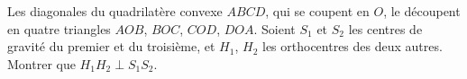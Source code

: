 Les diagonales du quadrilatère convexe $ABCD$, qui se coupent en $O$, le découpent en quatre triangles $AOB$, $BOC$, $COD$, $DOA$. Soient $S_1$ et $S_2$ les centres de gravité du premier et du troisième, et $H_1$, $H_2$ les orthocentres des deux autres. Montrer que $H_1H_2 \perp S_1S_2$.
